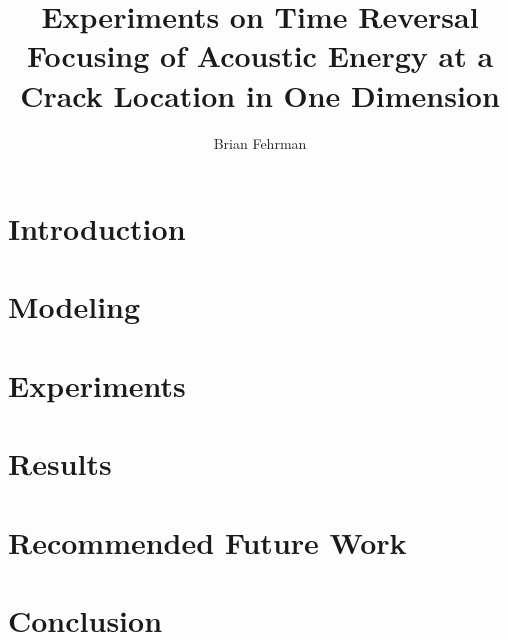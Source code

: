 \documentclass[13pt]{ucthesis}
\author{Brian Fehrman}
\title{Experiments on Time Reversal Focusing of Acoustic Energy at a Crack Location in One Dimension}
\begin{document}
\titlespacing{\chapter}{0pt}{-5pt}{-10pt}
\titlespacing{\section}{0pt}{0pt}{0pt}

\maketitle


\begin{frontmatter}
\begin{abstract}
\end{abstract}
\printglossary
\tableofcontents
\listoffigures
\end{frontmatter}




\chapter{Introduction}\label{ch:Introduction}

\chapter{Modeling}\label{ch:Modeling}


\chapter{Experiments}\label{ch:Experiments}


\chapter{Results}\label{ch:Results}


\chapter{Recommended Future Work}\label{ch:RecommendedFutureWork}


\chapter{Conclusion}\label{ch:Conclusion}




\end{document}
